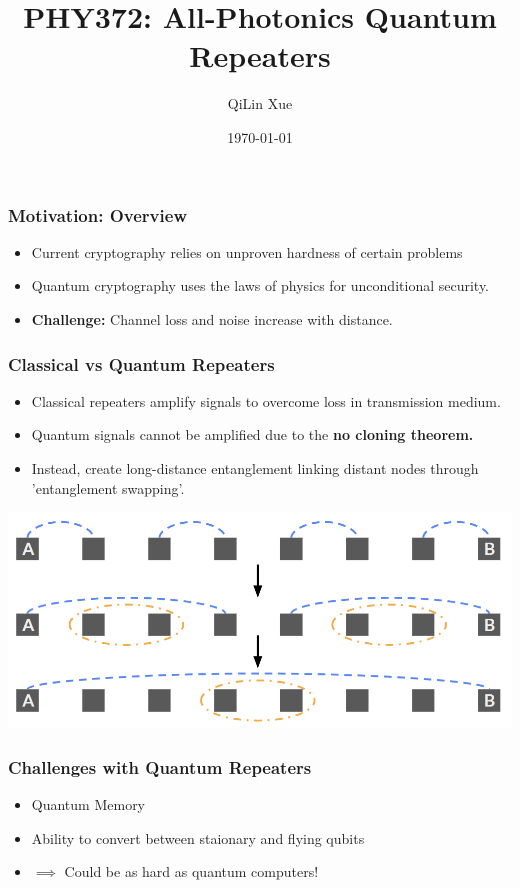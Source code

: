 \documentclass[aspectratio=169,xcolor=dvipsnames]{beamer}
\title[short title]{PHY372: All-Photonics Quantum Repeaters}
\author{QiLin Xue}
\institute[UofT] %
{
    University of Toronto
    \vskip 3pt
}
\date{\today} %
\begin{document}
\begin{frame}
    \titlepage
\end{frame}
\begin{frame}
\frametitle{Motivation: Overview}
\begin{itemize}
    \item Current cryptography relies on unproven hardness of certain problems
    \item Quantum cryptography uses the laws of physics for unconditional security.
    \item \textbf{Challenge:} Channel loss and noise increase with distance.
\end{itemize}
\end{frame}

\begin{frame}
\frametitle{Classical vs Quantum Repeaters}
\begin{itemize}
    \item Classical repeaters amplify signals to overcome loss in transmission medium.
    \item Quantum signals cannot be amplified due to the \textbf{no cloning theorem.}
    \item Instead, create long-distance entanglement linking distant nodes through 'entanglement swapping'.
\end{itemize}
\begin{center}
    \includegraphics[width=0.7\linewidth]{figs/quantum-repeater.png}
\end{center}
\end{frame}
\begin{frame}
\frametitle{Challenges with Quantum Repeaters}
\begin{itemize}
    \item Quantum Memory
    \item Ability to convert between staionary and flying qubits
    \item $\implies$ Could be as hard as quantum computers!  
\end{itemize}    
\end{frame}
\end{document}
